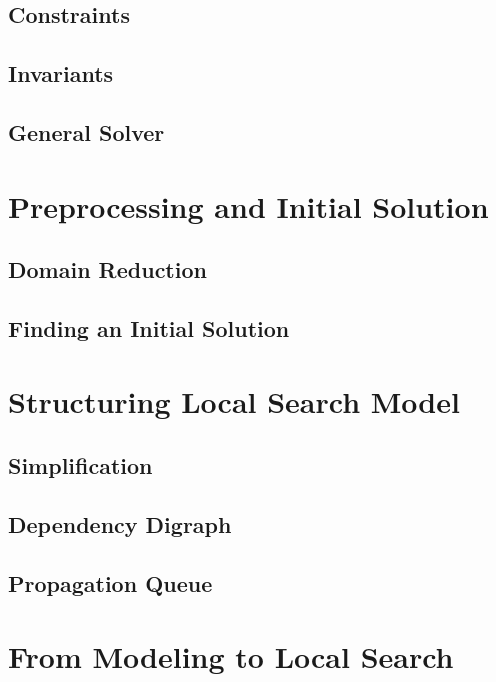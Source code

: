 \documentclass[a4paper,11pt]{article}
\begin{document}
  \subsection{Constraints}
   \label{sub_cons}
  \subsection{Invariants}
  \label{sub_inv}
  \subsection{General Solver}
  \label{sub_gen}
  
\newpage
\section{Preprocessing and Initial Solution} \label{sec_gecode}
  
  \subsection{Domain Reduction}
  
  \subsection{Finding an Initial Solution}
   \label{sub_inisol}

\newpage
\section{Structuring Local Search Model} \label{sec_ls}

  \subsection{Simplification}
  
  \subsection{Dependency Digraph}
     \label{sec_ddg}
  \subsection{Propagation Queue}  
    \label{sec_propaqueue}
    
  
\newpage  
\section{From Modeling to Local Search}

\newpage
\end{document}
